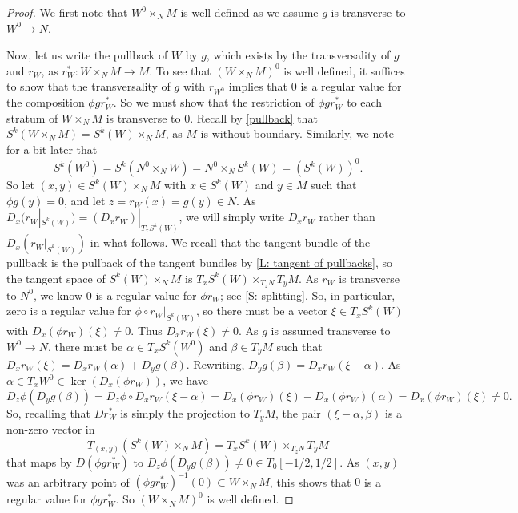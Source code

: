 \begin{proof}
	We first note that $W^0 \times_N M$ is well defined as we assume $g$ is transverse to $W^0 \to N$.

	Now, let us write the pullback of $W$ by $g$, which exists by the transversality of $g$ and $r_W$, as $r_W^* \colon W \times_N M \to M$.
	To see that $(W \times_N M)^0$ is well defined, it suffices to show that the transversality of $g$ with $r_{W^0}$ implies that $0$ is a regular value for the composition $\phi g r_W^*$.
	So we must show that the restriction of $\phi gr_W^*$ to each stratum of $W \times_N M$ is transverse to $0$.
	Recall by \cref{pullback} that $S^k(W \times_N M) = S^k(W) \times_N M$, as $M$ is without boundary.
	Similarly, we note for a bit later that $$S^k(W^0) = S^k(N^0 \times_N W) = N^0 \times_N S^k(W) = (S^k(W))^0.$$
	So let $(x,y) \in S^k(W) \times_N M$ with $x \in S^k(W)$ and $y \in M$ such that $\phi g(y)=0$, and let $z = r_W(x) = g(y) \in N$.
	As $D_x(r_W|_{S^k(W)}) = (D_xr_W)|_{T_xS^k(W)}$, we will simply write $D_xr_W$ rather than $D_x(r_W|_{S^k(W)})$ in what follows.
	We recall that the tangent bundle of the pullback is the pullback of the tangent bundles by \cref{L: tangent of pullbacks}, so the tangent space of $S^k(W) \times_N M$ is $T_x S^k(W) \times_{T_{z}N} T_yM$.
	As $r_W$ is transverse to $N^0$, we know $0$ is a regular value for $\phi r_W$; see \cref{S: splitting}.
	So, in particular, zero is a regular value for $\phi \circ r_W|_{S^k(W)}$, so there must be a vector $\xi \in T_xS^k(W)$ with $D_x(\phi r_W)(\xi)\neq 0$.
	Thus $D_xr_W(\xi) \neq 0$.
	As $g$ is assumed transverse to $W^0 \to N$, there must be $\alpha \in T_xS^k(W^0)$ and $\beta \in T_yM$ such that $D_xr_W(\xi) = D_xr_W(\alpha) + D_yg (\beta)$.
	Rewriting, $D_yg (\beta) = D_xr_W(\xi-\alpha)$.
	As $\alpha \in T_xW^0 \in \ker(D_x (\phi r_W))$, we have $$D_{z}\phi(D_yg (\beta)) = D_{z}\phi \circ D_xr_W(\xi-\alpha) = D_x(\phi r_W)(\xi)-D_x(\phi r_W)(\alpha) = D_x(\phi r_W)(\xi)\neq 0.$$
	So, recalling that $Dr_W^*$ is simply the projection to $T_yM$, the pair $( \xi-\alpha, \beta)$ is a non-zero vector in $$T_{(x,y)}(S^k(W) \times_N M) = T_x S^k(W) \times_{T_{z}N} T_yM$$ that maps by $D(\phi gr_W^*)$ to $D_{z}\phi(D_yg (\beta)) \neq 0 \in T_{0}[-1/2, 1/2]$.
	As $(x,y)$ was an arbitrary point of $(\phi gr^*_{W})^{-1}(0) \subset W \times_N M$, this shows that $0$ is a regular value for $\phi gr^*_W$.
	So $(W \times_N M)^0$ is well defined.


\end{proof}
